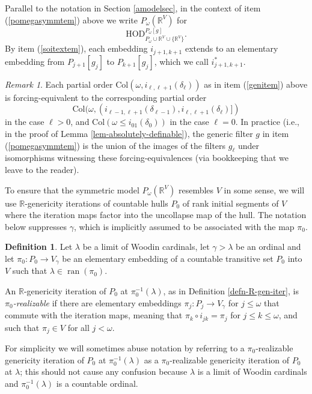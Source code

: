 \documentclass[fleqn, 11pt]{amsart}
\theoremstyle{plain}
\theoremstyle{definition}
\newtheorem{defn}[thm]{Definition} \newtheorem*{defn*}{Definition}
\theoremstyle{remark}
\newtheorem{rem}[thm]{Remark} \newtheorem*{rem*}{Remark}
\newcommand{\HOD}{\mathrm{HOD}}
\newcommand{\bbR}{\mathbb{R}}
\newcommand{\Col}{\mathrm{Col}}
\newcommand{\restrict}{\mathord{\restriction}}
\DeclareMathOperator{\ran}{ran}
\begin{document}
Parallel to the notation in Section \ref{amodelsec}, in the context of item (\ref{pomegasymmtem}) above we write
$P_{\omega}(\bbR^{V})$ for \[\HOD^{P_{\omega}[g]}_{P_{\omega} \cup \bbR^{V} \cup \{\bbR^{V}\}}.\] By item (\ref{soitextem}), each embedding $i_{j+1,k+1}$ extends to an elementary embedding from $P_{j+1}[g_j]$ to $P_{k+1}[g_j]$, which we call $i_{j+1,k+1}^*$.

\begin{rem}\label{gisomrem} Each partial order $\Col(\omega,i_{\ell,\ell+1}(\delta_\ell))$ as in item (\ref{genitem}) above is forcing-equivalent to the corresponding partial order \[\Col(\omega, (i_{\ell - 1, \ell + 1}(\delta_{\ell - 1}),i_{\ell, \ell+1}(\delta_{\ell})])\] in the case $\ell > 0$, and $\Col(\omega \leq i_{01}(\delta_{0}))$ in the case $\ell= 0$. In practice (i.e., in the proof of Lemma \ref{lem-absolutely-definable}), the generic filter $g$ in item (\ref{pomegasymmtem}) is the union of the %
images of the filters $g_{\ell}$ under isomorphisms witnessing these forcing-equivalences (via bookkeeping that we leave to the reader). 
\end{rem}

To ensure that the symmetric model $P_\omega(\mathbb{R}^V)$ resembles $V$ in some sense,
we will use $\mathbb{R}$-genericity iterations of countable hulls $P_0$ of rank initial segments of $V$ where the iteration maps factor into the uncollapse map of the hull. The notation below suppresses $\gamma$, which is implicitly assumed to be associated with the map $\pi_{0}$. 

\begin{defn}
 Let $\lambda$ be a limit of Woodin cardinals, let $\gamma > \lambda$ be an ordinal and let $\pi_0 \colon P_0 \to V_{\gamma}$ be an elementary embedding of a countable transitive set $P_0$ into $V$ such that $\lambda \in \ran(\pi_0)$.

 An $\mathbb{R}$-genericity iteration of $P_0$ at $\pi_0^{-1}(\lambda)$, as in Definition \ref{defn-R-gen-iter}, is \emph{$\pi_0$-realizable} if there are elementary embeddings $\pi_j : P_j \to V_{\gamma}$ for $j \le \omega$ that commute with the iteration maps, meaning that $\pi_k \circ i_{jk} = \pi_j$ for $j \le k \le \omega$, and such that $\pi_j \in V$ for all $j < \omega$.
\end{defn}

For simplicity we will sometimes abuse notation by referring to a $\pi_0$-realizable genericity iteration of $P_0$ at $\pi_0^{-1}(\lambda)$ as a $\pi_0$-realizable genericity iteration of $P_0$ at $\lambda$; this should not cause any confusion because $\lambda$ is a limit of Woodin cardinals and $\pi_0^{-1}(\lambda)$ is a countable ordinal.
\end{document}
